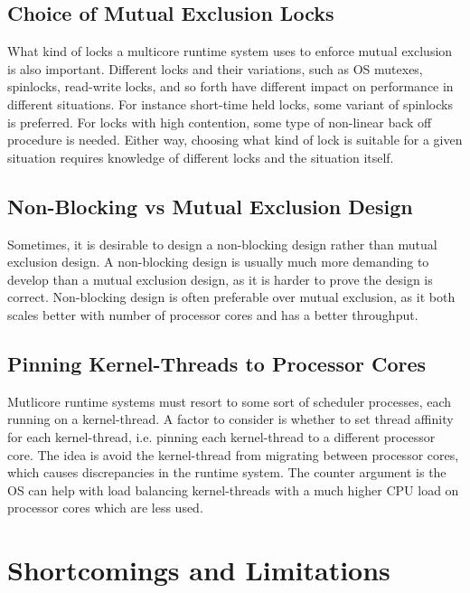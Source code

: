 \section{Choice of Mutual Exclusion Locks}

What kind of locks a multicore runtime system uses to enforce mutual exclusion is also important. Different locks and their variations, such as OS mutexes, spinlocks, read\hyp{}write locks, and so forth have different impact on performance in different situations. For instance short\hyp{}time held locks, some variant of spinlocks is preferred. For locks with high contention, some type of non\hyp{}linear back off procedure is needed. Either way, choosing what kind of lock is suitable for a given situation requires knowledge of different locks and the situation itself.

\section{Non\hyp{}Blocking vs Mutual Exclusion Design}

Sometimes, it is desirable to design a non\hyp{}blocking design rather than mutual exclusion design. A non\hyp{}blocking design is usually much more demanding to develop than a mutual exclusion design, as it is harder to prove the design is correct. Non\hyp{}blocking design is often preferable over mutual exclusion, as it both scales better with number of processor cores and has a better throughput. 

\section{Pinning Kernel\hyp{}Threads to Processor Cores}

Mutlicore runtime systems must resort to some sort of scheduler processes, each running on a kernel\hyp{}thread. A factor to consider is whether to set thread affinity for each kernel\hyp{}thread, i.e. pinning each kernel\hyp{}thread to a different processor core. The idea is avoid the kernel\hyp{}thread from migrating between processor cores, which causes discrepancies in the runtime system. The counter argument is the OS can help with load balancing kernel\hyp{}threads with a much higher CPU load on processor cores which are less used. 


\chapter{Shortcomings and Limitations}
\label{ch:shortcomings_limitations}


